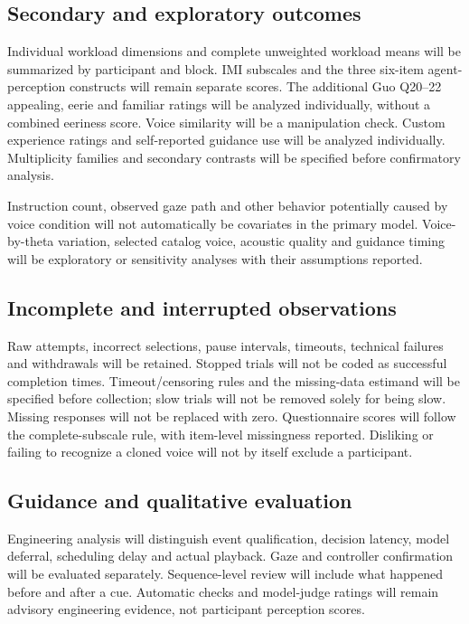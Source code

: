 \documentclass[11pt,letterpaper]{article}
\begin{document}
\subsection{Secondary and exploratory outcomes}
Individual workload dimensions and complete unweighted workload means will be summarized by participant and block. IMI subscales and the three six-item agent-perception constructs will remain separate scores. The additional Guo Q20--22 appealing, eerie and familiar ratings will be analyzed individually, without a combined eeriness score. Voice similarity will be a manipulation check. Custom experience ratings and self-reported guidance use will be analyzed individually. Multiplicity families and secondary contrasts will be specified before confirmatory analysis.

Instruction count, observed gaze path and other behavior potentially caused by voice condition will not automatically be covariates in the primary model. Voice-by-theta variation, selected catalog voice, acoustic quality and guidance timing will be exploratory or sensitivity analyses with their assumptions reported.

\subsection{Incomplete and interrupted observations}
Raw attempts, incorrect selections, pause intervals, timeouts, technical failures and withdrawals will be retained. Stopped trials will not be coded as successful completion times. Timeout/censoring rules and the missing-data estimand will be specified before collection; slow trials will not be removed solely for being slow. Missing responses will not be replaced with zero. Questionnaire scores will follow the complete-subscale rule, with item-level missingness reported. Disliking or failing to recognize a cloned voice will not by itself exclude a participant.

\subsection{Guidance and qualitative evaluation}
Engineering analysis will distinguish event qualification, decision latency, model deferral, scheduling delay and actual playback. Gaze and controller confirmation will be evaluated separately. Sequence-level review will include what happened before and after a cue. Automatic checks and model-judge ratings will remain advisory engineering evidence, not participant perception scores.
\end{document}
